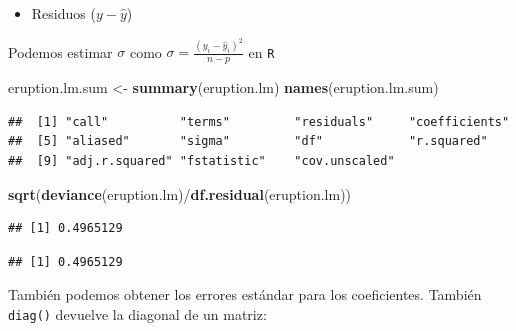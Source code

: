\documentclass[]{article}
\def\tightlist{}
\newenvironment{Shaded}{\begin{snugshade}}{\end{snugshade}}
\newcommand{\KeywordTok}[1]{\textcolor[rgb]{0.13,0.29,0.53}{\textbf{{#1}}}}
\newcommand{\StringTok}[1]{\textcolor[rgb]{0.31,0.60,0.02}{{#1}}}
\newcommand{\CommentTok}[1]{\textcolor[rgb]{0.56,0.35,0.01}{\textit{{#1}}}}
\newcommand{\NormalTok}[1]{{#1}}
\numberwithin{equation}{section}
\begin{document}
\begin{itemize}
\tightlist
\item
  Residuos (\(y-\hat{y}\))
\end{itemize}

\begin{Shaded}
\end{Shaded}

Podemos estimar \(\sigma\) como
\(\sigma = \frac{(y_i-\hat{y}_i)^2}{n-p}\) en \texttt{R}

\begin{Shaded}
\begin{Highlighting}[]
\NormalTok{eruption.lm.sum <-}\StringTok{ }\KeywordTok{summary}\NormalTok{(eruption.lm)}
\KeywordTok{names}\NormalTok{(eruption.lm.sum)}
\end{Highlighting}
\end{Shaded}

\begin{verbatim}
##  [1] "call"          "terms"         "residuals"     "coefficients" 
##  [5] "aliased"       "sigma"         "df"            "r.squared"    
##  [9] "adj.r.squared" "fstatistic"    "cov.unscaled"
\end{verbatim}

\begin{Shaded}
\begin{Highlighting}[]
\KeywordTok{sqrt}\NormalTok{(}\KeywordTok{deviance}\NormalTok{(eruption.lm)/}\KeywordTok{df.residual}\NormalTok{(eruption.lm))}
\end{Highlighting}
\end{Shaded}

\begin{verbatim}
## [1] 0.4965129
\end{verbatim}

\begin{Shaded}
\end{Shaded}

\begin{verbatim}
## [1] 0.4965129
\end{verbatim}

También podemos obtener los errores estándar para los coeficientes.
También \texttt{diag()} devuelve la diagonal de un matriz:
\end{document}
